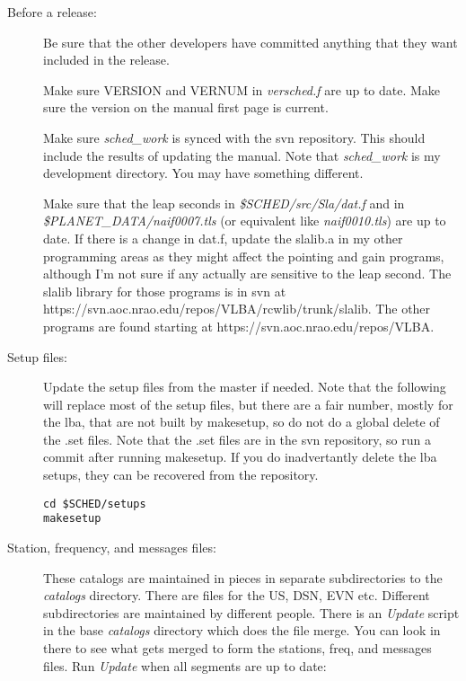 \documentclass{report}
\begin{document}
\begin{description}

\item [Before a release:]

Be sure that the other developers have committed anything that they
want included in the release.

Make sure VERSION and VERNUM in {\sl versched.f} are up to date.
Make sure the version on the manual first page is current.

Make sure {\sl sched\_work} is synced with the svn repository.  This
should include the results of updating the manual.  Note that {\sl
sched\_work} is my development directory.  You may have something
different.

Make sure that the leap seconds in {\sl \$SCHED/src/Sla/dat.f} and
in {\sl \$PLANET\_DATA/naif0007.tls} (or equivalent like {\sl naif0010.tls}) 
are up to date.  If there is a change in dat.f, update the slalib.a 
in my other programming areas as they might affect the pointing and gain
programs, although I'm not sure if any actually are sensitive to
the leap second.  The slalib library for those programs is in svn at
https://svn.aoc.nrao.edu/repos/VLBA/rcwlib/trunk/slalib.  The other
programs are found starting at https://svn.aoc.nrao.edu/repos/VLBA.


\item [Setup files:]

Update the setup files from the master if needed.  Note that the following
will replace most of the setup files, but there are a fair number, mostly
for the lba, that are not built by makesetup, so do not do a global delete
of the .set files.  Note that the .set files are in the svn repository,
so run a commit after running makesetup.  If you do inadvertantly delete
the lba setups, they can be recovered from the repository.

\begin{verbatim}
cd $SCHED/setups
makesetup
\end{verbatim}

\item [Station, frequency, and messages files:]

These catalogs are maintained in pieces in separate subdirectories
to the {\sl catalogs} directory.  There are files for the US, DSN, 
EVN etc.  Different subdirectories are maintained by different people.
There is an {\sl Update} script in the base {\sl catalogs} directory
which does the file merge.  You can look in there to see what gets merged
to form the stations, freq, and messages files.  Run {\sl Update} when
all segments are up to date:


\end{description}
\end{document}
